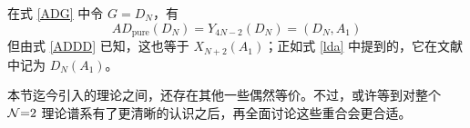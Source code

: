 在式 \eqref{ADG} 中令 $G=D_N$，有
\begin{equation}
AD_\text{pure}(D_N)=Y_{4N-2}(D_N)=(D_N,A_1)
\end{equation}
但由式 \eqref{ADDD} 已知，这也等于 $X_{N+2}(A_1)$；正如式 \eqref{lda} 中提到的，它在文献 \cite{Cecotti:2013lda} 中记为 $D_N(A_1)$。

本节迄今引入的理论之间，还存在其他一些偶然等价。不过，或许等到对整个 $\mathcal{N}{=}2$ 理论谱系有了更清晰的认识之后，再全面讨论这些重合会更合适。
